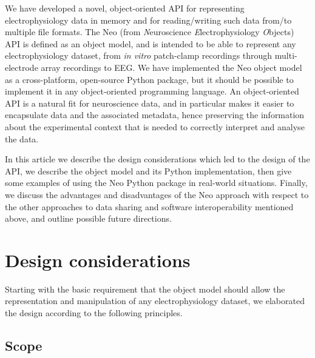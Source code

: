 \documentclass{frontiers}
\newcommand{\latin}[1]{\textit{#1}}
\begin{document}
We have developed a novel, object-oriented API for representing electrophysiology data in memory and for reading/writing such data from/to multiple file formats.
The Neo (from \emph{N}euroscience \emph{E}lectrophysiology \emph{O}bjects) API is defined as an object model, and is intended to be able to represent any electrophysiology dataset, from \latin{in vitro} patch-clamp recordings through multi-electrode array recordings to EEG.
We have implemented the Neo object model as a cross-platform, open-source Python package, but it should be possible to implement it in any object-oriented programming language.
An object-oriented API is a natural fit for neuroscience data, and in particular makes it easier to encapsulate data and the associated metadata, hence preserving the information about the experimental context that is needed to correctly interpret and analyse the data.

In this article we describe the design considerations which led to the design of the API, we describe the object model and its Python implementation, then give some examples of using the Neo Python package in real-world situations. Finally, we discuss the advantages and disadvantages of the Neo approach with respect to the other approaches to data sharing and software interoperability mentioned above, and outline possible future directions.


\section{Design considerations}


Starting with the basic requirement that the object model should allow the representation and manipulation of any electrophysiology dataset, we elaborated the design according to the following principles. 

\subsection{Scope}
\end{document}
